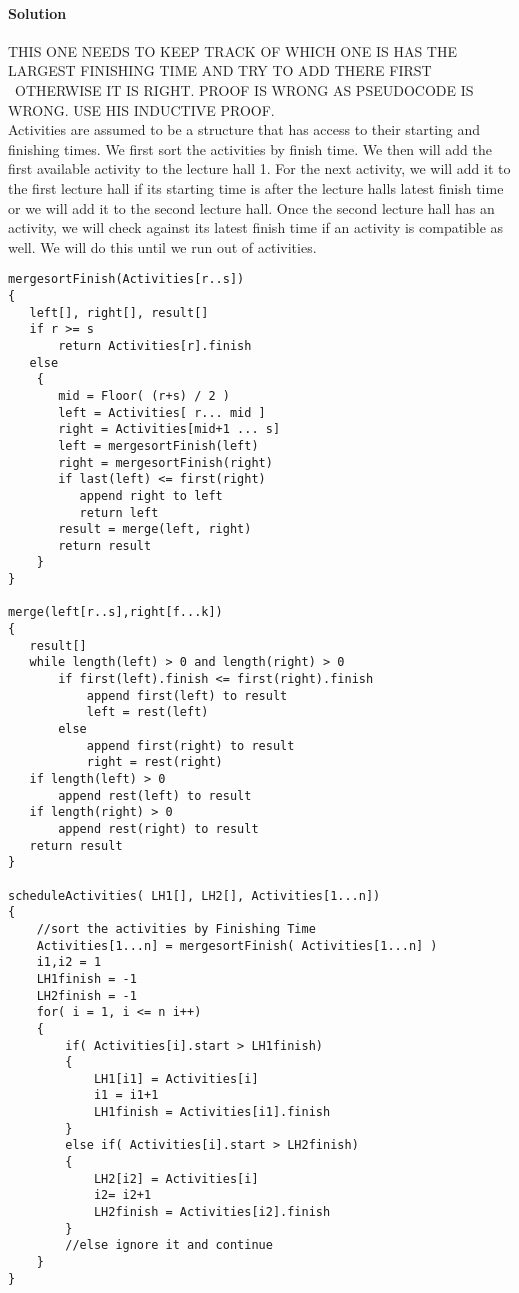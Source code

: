 \documentclass[12pt]{article}
\begin{document}
\paragraph{Solution}
THIS ONE NEEDS TO KEEP TRACK OF WHICH ONE IS  HAS THE LARGEST FINISHING TIME AND TRY TO ADD THERE FIRST\\\
OTHERWISE IT IS RIGHT.  PROOF IS WRONG AS PSEUDOCODE IS WRONG.  USE HIS INDUCTIVE PROOF.\\
Activities are assumed to be a structure that has access to their starting and finishing times.
We first sort the activities by finish time.
We then will add the first available activity to the lecture hall 1.  For the next activity, we will add it to
the first lecture hall if its starting time is after the lecture halls latest finish time or we will add it to 
the second lecture hall.  Once the second lecture hall has an activity, we will check against its latest finish time
if an activity is compatible as well. We will do this until we run out of activities.
\\
 \begin{lstlisting}
mergesortFinish(Activities[r..s])
{
   left[], right[], result[]
   if r >= s
       return Activities[r].finish
   else
	{	
	   mid = Floor( (r+s) / 2 )
       left = Activities[ r... mid ]
       right = Activities[mid+1 ... s]
       left = mergesortFinish(left)
       right = mergesortFinish(right)
       if last(left) <= first(right) 
          append right to left
          return left
       result = merge(left, right)
       return result
	}
}

merge(left[r..s],right[f...k])
{
   result[]
   while length(left) > 0 and length(right) > 0
       if first(left).finish <= first(right).finish
           append first(left) to result
           left = rest(left)
       else
           append first(right) to result
           right = rest(right)
   if length(left) > 0 
       append rest(left) to result
   if length(right) > 0 
       append rest(right) to result
   return result			
}

scheduleActivities( LH1[], LH2[], Activities[1...n])
{
	//sort the activities by Finishing Time
	Activities[1...n] = mergesortFinish( Activities[1...n] )
	i1,i2 = 1
	LH1finish = -1
	LH2finish = -1
	for( i = 1, i <= n i++)
	{
		if( Activities[i].start > LH1finish)
		{
			LH1[i1] = Activities[i]
			i1 = i1+1
			LH1finish = Activities[i1].finish
		}
		else if( Activities[i].start > LH2finish)
		{
			LH2[i2] = Activities[i]
			i2= i2+1
			LH2finish = Activities[i2].finish
		}
		//else ignore it and continue
	}
}

\end{lstlisting}
\end{document}
